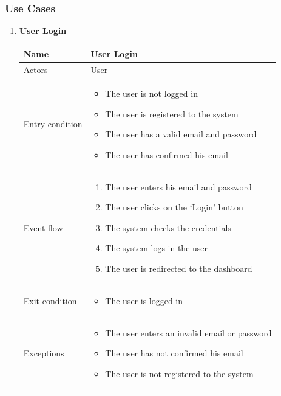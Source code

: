 \subsubsection{Use Cases}
\begin{enumerate}[label=UC\arabic*:]
    \item \textbf{User Login} \\
    \begin{tabular}{|p{3cm}|p{8cm}|}
        \hline
        Name & User Login \\
        \hline
        Actors & User \\
        \hline
        Entry condition & 
        \begin{itemize}
            \item The user is not logged in
            \item The user is registered to the system
            \item The user has a valid email and password
            \item The user has confirmed his email
        \end{itemize} 
        \\
        \hline
        Event flow &
        \begin{enumerate}[label=\arabic*.]
            \item The user enters his email and password
            \item The user clicks on the `Login' button
            \item The system checks the credentials
            \item The system logs in the user
            \item The user is redirected to the dashboard
        \end{enumerate}
        \\
        \hline
        Exit condition & 
        \begin{itemize}
            \item The user is logged in
        \end{itemize}
        \\
        \hline
        Exceptions &
        \begin{itemize}
            \item The user enters an invalid email or password
            \item The user has not confirmed his email
            \item The user is not registered to the system

\end{itemize}
\end{tabular}
\end{enumerate}
